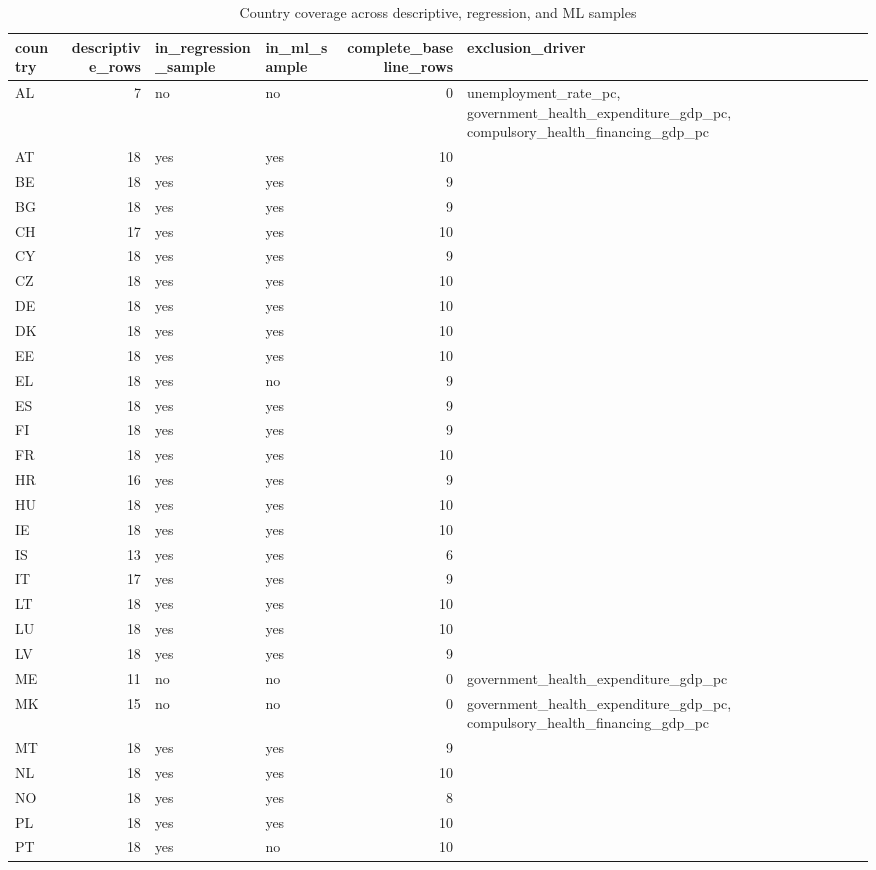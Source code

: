 \begin{table}
\caption{Country coverage across descriptive, regression, and ML samples}
\label{tab:country_coverage}
\begin{tabular}{lrllrl}
\toprule
country & descriptive\_rows & in\_regression\_sample & in\_ml\_sample & complete\_baseline\_rows & exclusion\_driver \\
\midrule
AL & 7 & no & no & 0 & unemployment\_rate\_pc, government\_health\_expenditure\_gdp\_pc, compulsory\_health\_financing\_gdp\_pc \\
AT & 18 & yes & yes & 10 &  \\
BE & 18 & yes & yes & 9 &  \\
BG & 18 & yes & yes & 9 &  \\
CH & 17 & yes & yes & 10 &  \\
CY & 18 & yes & yes & 9 &  \\
CZ & 18 & yes & yes & 10 &  \\
DE & 18 & yes & yes & 10 &  \\
DK & 18 & yes & yes & 10 &  \\
EE & 18 & yes & yes & 10 &  \\
EL & 18 & yes & no & 9 &  \\
ES & 18 & yes & yes & 9 &  \\
FI & 18 & yes & yes & 9 &  \\
FR & 18 & yes & yes & 10 &  \\
HR & 16 & yes & yes & 9 &  \\
HU & 18 & yes & yes & 10 &  \\
IE & 18 & yes & yes & 10 &  \\
IS & 13 & yes & yes & 6 &  \\
IT & 17 & yes & yes & 9 &  \\
LT & 18 & yes & yes & 10 &  \\
LU & 18 & yes & yes & 10 &  \\
LV & 18 & yes & yes & 9 &  \\
ME & 11 & no & no & 0 & government\_health\_expenditure\_gdp\_pc \\
MK & 15 & no & no & 0 & government\_health\_expenditure\_gdp\_pc, compulsory\_health\_financing\_gdp\_pc \\
MT & 18 & yes & yes & 9 &  \\
NL & 18 & yes & yes & 10 &  \\
NO & 18 & yes & yes & 8 &  \\
PL & 18 & yes & yes & 10 &  \\
PT & 18 & yes & no & 10 &  \\

\end{tabular}
\end{table}
